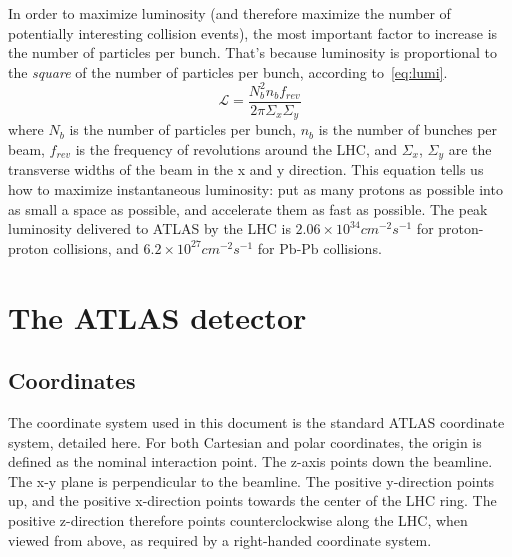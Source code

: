 In order to maximize luminosity (and therefore maximize the number of potentially interesting collision events), the most important factor to increase is the number of particles per bunch.
That's because luminosity is proportional to the \textit{square} of the number of particles per bunch, according to~\ref{eq:lumi}.
\begin{equation}\label{eq:lumi}
\mathcal{L} = \frac{N_b^2 n_b f_{rev}}{2\pi \Sigma_x \Sigma_y}
\end{equation}
where $N_b$ is the number of particles per bunch, $n_b$ is the number of bunches per beam, $f_{rev}$ is the frequency of revolutions around the LHC, and $\Sigma_x$, $\Sigma_y$ are the transverse widths of the beam in the x and y direction.
This equation tells us how to maximize instantaneous luminosity: put as many protons as possible into as small a space as possible, and accelerate them as fast as possible.
The peak luminosity delivered to ATLAS by the LHC is $2.06\times10^{34}cm^{-2}s^{-1}$ for proton-proton collisions, and $6.2\times10^{27}cm^{-2}s^{-1}$ for $\mathrm{Pb}$-$\mathrm{Pb}$ collisions.

\section{The ATLAS detector}\label{sec:atlas_detector}
\subsection{Coordinates}\label{subsec:coordinates}
The coordinate system used in this document is the standard ATLAS coordinate system, detailed here.
For both Cartesian and polar coordinates, the origin is defined as the nominal interaction point.
The z-axis points down the beamline.
The x-y plane is perpendicular to the beamline.
The positive y-direction points up, and the positive x-direction points towards the center of the LHC ring.
The positive z-direction therefore points counterclockwise along the LHC, when viewed from above, as required by a right-handed coordinate system.

